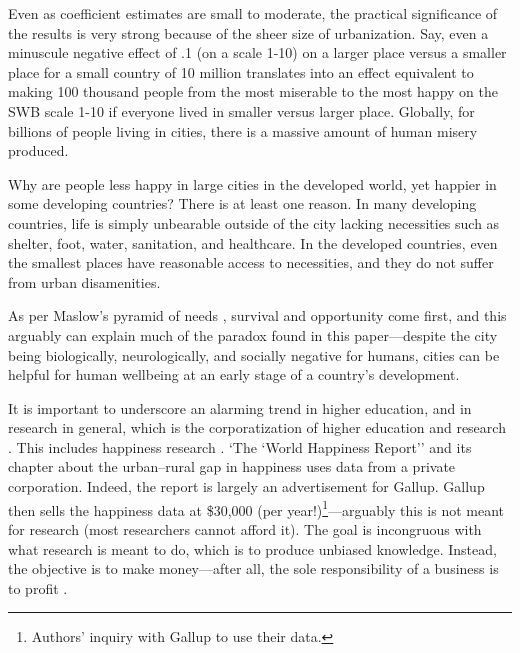 \documentclass[10pt, letterpaper]{article}
\begin{document}
Even as coefficient estimates are small to moderate, the practical significance
of the results is very strong because of the sheer size of urbanization. 
%
Say, even a minuscule negative effect of .1 (on a scale 1-10) on a larger place versus
a smaller place for a small country of 10 million translates into an effect equivalent to making 100 thousand people from the most miserable to the most happy on the SWB scale 1-10 if everyone lived in smaller versus larger place. %
 Globally, for billions of people living in cities, there is a massive amount of
 human misery produced. 

Why are people less happy in large cities in the developed world, yet happier in some
developing countries? There is at least one reason. In many developing countries, life is simply unbearable outside of the city lacking necessities such as shelter, foot, water, sanitation, and healthcare. In the developed countries, even the smallest places have reasonable access to necessities, and they do not suffer from urban disamenities. %
 
As per Maslow's pyramid of needs \citep{maslow87}, survival and opportunity
come first, and this arguably can explain much of the paradox found in this
paper---despite the city being biologically, neurologically, and socially negative
for humans, cities can be helpful for human wellbeing at an early stage of a country's development. 

It is important to underscore an alarming trend in higher education, and in research in general, which is the corporatization of higher education and research \citep{mills2012corporatization,cox2013corporatization,millsNYT12fa,CatropaNYT20feb8,schmidlinNYT15oct10}. This includes happiness research \citep{davies15}. `The `World Happiness Report'' \citep{helliwell20} and its chapter about the urban--rural gap in happiness \citep{burger20} uses data from a private corporation. Indeed, the report %
 is
 largely an advertisement for Gallup. Gallup then sells the happiness data at
\$30,000 (per year!)\footnote{Authors' inquiry with Gallup to use their data.}---arguably this is not meant for research (most researchers cannot afford it). The goal is incongruous with what research is meant to do, which is to produce unbiased knowledge. Instead, the objective is to make money---after all, the sole responsibility of a business is to profit \citep{friedman70}.
\end{document}
